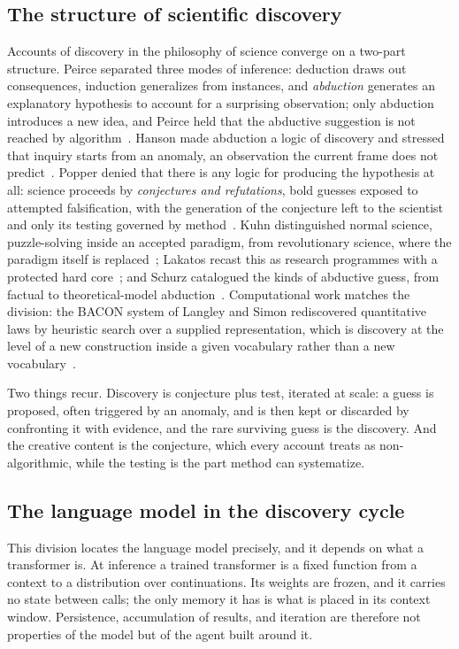 \documentclass[11pt]{article}
\begin{document}
\subsection{The structure of scientific discovery}
\label{sec:philsci}

Accounts of discovery in the philosophy of science converge on a two-part structure. Peirce separated
three modes of inference: deduction draws out consequences, induction generalizes from instances, and
\emph{abduction} generates an explanatory hypothesis to account for a surprising observation; only
abduction introduces a new idea, and Peirce held that the abductive suggestion is not reached by
algorithm~\cite{peirce}. Hanson made abduction a logic of discovery and stressed that inquiry starts
from an anomaly, an observation the current frame does not predict~\cite{hanson}. Popper denied that
there is any logic for producing the hypothesis at all: science proceeds by \emph{conjectures and
refutations}, bold guesses exposed to attempted falsification, with the generation of the conjecture
left to the scientist and only its testing governed by method~\cite{popper}. Kuhn distinguished normal
science, puzzle-solving inside an accepted paradigm, from revolutionary science, where the paradigm
itself is replaced~\cite{kuhn}; Lakatos recast this as research programmes with a protected hard
core~\cite{lakatos}; and Schurz catalogued the kinds of abductive guess, from factual to
theoretical-model abduction~\cite{schurz}. Computational work matches the division: the BACON system of
Langley and Simon rediscovered quantitative laws by heuristic search over a supplied representation,
which is discovery at the level of a new construction inside a given vocabulary rather than a new
vocabulary~\cite{bacon}.

Two things recur. Discovery is conjecture plus test, iterated at scale: a guess is proposed, often
triggered by an anomaly, and is then kept or discarded by confronting it with evidence, and the rare
surviving guess is the discovery. And the creative content is the conjecture, which every account
treats as non-algorithmic, while the testing is the part method can systematize.

\subsection{The language model in the discovery cycle}
\label{sec:inference-loop}

This division locates the language model precisely, and it depends on what a transformer is. At
inference a trained transformer is a fixed function from a context to a distribution over
continuations. Its weights are frozen, and it carries no state between calls; the only memory it has is
what is placed in its context window. Persistence, accumulation of results, and iteration are therefore
not properties of the model but of the agent built around it.
\end{document}
